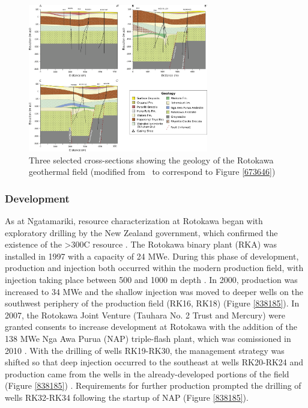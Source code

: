 \begin{figure}
\begin{center}
\includegraphics[width=0.7\textwidth,height=0.7\textheight,keepaspectratio]{Chapter_1_Intro/figures/Rotokawa_geology_11-20/Rotokawa_geology_11-20_original}
\caption{{Three selected cross-sections showing the geology of the Rotokawa
geothermal field (modified from~\protect\citet{Sewell_2015} to correspond to
Figure {\ref{673646}})
{\label{599670}}%
}}
\end{center}
\end{figure}

\subsubsection{Development}
As at Ngatamariki, resource characterization at Rotokawa began with exploratory drilling by the New Zealand government, which confirmed the existence of the \textgreater300\textdegree C resource \citep{Sewell_2015,McNamara_2016}. The Rotokawa binary plant (RKA) was installed in 1997 with a capacity of 24 MWe. During this phase of development, production and injection both occurred within the modern production field, with injection taking place between 500 and 1000 m depth \citep{Sewell_2015}. In 2000, production was increased to 34 MWe and the shallow injection was moved to deeper wells on the southwest periphery of the production field (RK16, RK18) (Figure \ref{838185}). In 2007, the Rotokawa Joint Venture (Tauhara No. 2 Trust and Mercury) were granted consents to increase development at Rotokawa with the addition of the 138 MWe Nga Awa Purua (NAP) triple-flash plant, which was comissioned in 2010 \citep{Sewell_2015}. With the drilling of wells RK19-RK30, the management strategy was shifted so that deep injection occurred to the southeast at wells RK20-RK24 and production came from the wells in the already-developed portions of the field (Figure \ref{838185}) \citep{Sewell_2015,McNamara_2016}. Requirements for further production prompted the drilling of wells RK32-RK34 following the startup of NAP (Figure \ref{838185}).

